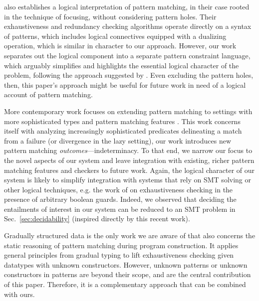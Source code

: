 \citet{DBLP:conf/popl/Krishnaswami09} also establishes a logical interpretation of pattern matching, in their case rooted in the technique of focusing, without considering pattern holes. Their exhaustiveness and redundancy checking algorithms operate directly on a syntax of patterns, which includes logical connectives equipped with a dualizing operation, which is similar in character to our approach. However, our work separates out the logical component into a separate pattern constraint language, which arguably simplifies and highlights the essential logical character of the problem, following the approach suggested by \citet{Harper2012}. Even excluding the pattern holes, then, this paper's approach might be useful for future work in need of a logical account of pattern matching.

More contemporary work focuses on extending pattern matching to settings with more sophisticated types and pattern matching features \cite{DBLP:conf/icfp/VazouSJVJ14,DBLP:journals/pacmpl/CockxA18,DBLP:conf/itp/Sozeau10,DBLP:conf/icfp/KarachaliasSVJ15,DBLP:journals/pacmpl/GrafJS20,DBLP:journals/jfp/ConventLMM20,DBLP:conf/popl/AbelPTS13}.
This work concerns itself with analyzing increasingly sophisticated predicates delineating a match from a failure (or divergence in the lazy setting), our work introduces new pattern matching \emph{outcomes}---indeterminacy.
To that end, we narrow our focus to the novel aspects of our system and leave integration with existing, richer pattern matching features and checkers to future work. Again, the logical character of our system is likely to simplify integration with systems that rely on SMT solving or other logical techniques, e.g. the work of \citet{DBLP:journals/pacmpl/GrafJS20} on exhaustiveness checking in the presence of arbitrary boolean guards. Indeed, we observed that deciding the entailments of interest in our system can be reduced to an SMT problem in Sec.~\ref{sec:decidability} (inspired directly by this recent work).

Gradually structured data \cite{DBLP:journals/pacmpl/MalewskiGT21} is
the only work we are aware of that also concerns the static reasoning
of pattern matching during program construction. It applies general
principles from gradual typing to lift exhaustiveness checking given
datatypes with unknown constructors. However, unknown patterns or
unknown constructors in patterns are beyond their scope, and are the
central contribution of this paper. Therefore, it is a complementary 
approach that can be combined with ours.

